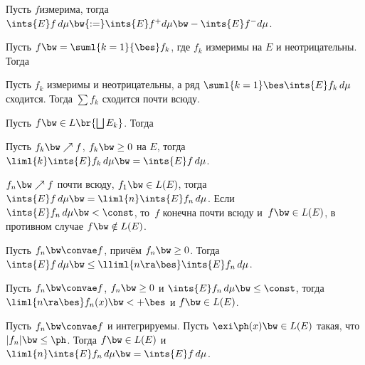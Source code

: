 \documentclass[a4paper]{article}
\begin{document}
\begin{df}
  Пусть $f$\т измерима, тогда $\ints{E}f\,d\mu \bw{:=} \ints{E}f^+d\mu \bw- \ints{E}f^-d\mu$.
\end{df}

\begin{theorem}
  Пусть $f \bw= \suml{k=1}{\bes} f_k$, где $f_k$ измеримы на $E$ и неотрицательны.
  Тогда 
\end{theorem}

\begin{imp}
  Пусть $f_k$ измеримы и неотрицательны, а ряд $\suml{k=1}\bes \ints{E}f_k\,d\mu$ сходится.
  Тогда $\sum f_k$ сходится почти всюду.
\end{imp}

\begin{theorem}
  Пусть $f \bw\in L\br{\bigsqcup E_k}$. Тогда
\end{theorem}

\begin{theorem}
  Пусть $f_k \bw\nearrow f$, $f_k \bw\ge 0$ на $E$, тогда
  $\liml{k}\ints{E}f_k\,d\mu \bw= \ints{E}f\,d\mu$.
\end{theorem}

\begin{theorem}
  $f_n \bw\nearrow f$ почти всюду, $f_1 \bw\in L(E)$, тогда
  $\ints{E}f\,d\mu \bw= \liml{n}\ints{E}f_n\,d\mu$.
  Если $\ints{E}f_n\,d\mu \bw< \const$, то~$f$
  конечна почти всюду и~$f \bw\in L(E)$, в противном случае $f \bw\notin L(E)$.
\end{theorem}

\begin{theorem}[Фату]
  Пусть $f_n \bw\convae f$, причём $f_n \bw\ge 0$. Тогда
  $\ints{E}f\,d\mu \bw\le \lliml{n\ra\bes} \ints{E}f_n\,d\mu$.
\end{theorem}

\begin{imp}
  Пусть $f_n \bw\convae f$, $f_n \bw\ge 0$ и $\ints{E}f_n\,d\mu \bw\le \const$,
  тогда $\liml{n\ra\bes}f_n(x) \bw< +\bes$ и $f \bw\in L(E)$.
\end{imp}

\begin{theorem}
  Пусть $f_n \bw\convae f$ и интегрируемы. Пусть $\exi \ph(x) \bw\in L(E)$ такая, что $|f_n| \bw\le \ph$.
  Тогда $f \bw\in L(E)$ и $\liml{n}\ints{E}f_n\,d\mu \bw= \ints{E}f\,d\mu$.
\end{theorem}
\end{document}
